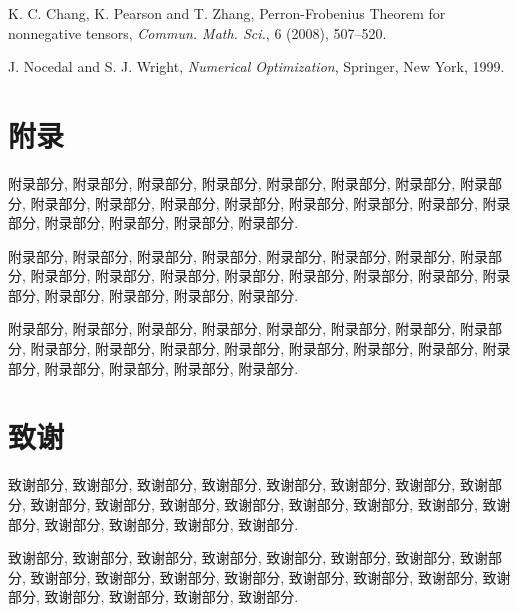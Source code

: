 \documentclass{ecnumaster}
\begin{document}
\backmatter
\linespread{1.1}\selectfont

\begin{thebibliography}{99}
\thispagestyle{plain}

\newblock K. C. Chang, K. Pearson and T. Zhang,
\newblock Perron-Frobenius Theorem for nonnegative tensors,
\newblock \emph{Commun. Math. Sci.}, 6 (2008), 507--520.

\newblock J. Nocedal and S. J. Wright,
\newblock \emph{Numerical Optimization},
\newblock Springer, New York, 1999.

\end{thebibliography}

\clearpage{\pagestyle{empty}\cleardoublepage}
\linespread{1.4}\selectfont
\chapter*{附录}

附录部分, 附录部分, 附录部分, 附录部分, 附录部分,
附录部分, 附录部分, 附录部分, 附录部分, 附录部分,
附录部分, 附录部分, 附录部分, 附录部分, 附录部分,
附录部分, 附录部分, 附录部分, 附录部分, 附录部分.

附录部分, 附录部分, 附录部分, 附录部分, 附录部分,
附录部分, 附录部分, 附录部分, 附录部分, 附录部分,
附录部分, 附录部分, 附录部分, 附录部分, 附录部分,
附录部分, 附录部分, 附录部分, 附录部分, 附录部分.

附录部分, 附录部分, 附录部分, 附录部分, 附录部分,
附录部分, 附录部分, 附录部分, 附录部分, 附录部分,
附录部分, 附录部分, 附录部分, 附录部分, 附录部分,
附录部分, 附录部分, 附录部分, 附录部分, 附录部分.


\clearpage{\pagestyle{empty}\cleardoublepage}
\chapter*{致谢}

致谢部分, 致谢部分, 致谢部分, 致谢部分, 致谢部分,
致谢部分, 致谢部分, 致谢部分, 致谢部分, 致谢部分,
致谢部分, 致谢部分, 致谢部分, 致谢部分, 致谢部分,
致谢部分, 致谢部分, 致谢部分, 致谢部分, 致谢部分.

致谢部分, 致谢部分, 致谢部分, 致谢部分, 致谢部分,
致谢部分, 致谢部分, 致谢部分, 致谢部分, 致谢部分,
致谢部分, 致谢部分, 致谢部分, 致谢部分, 致谢部分,
致谢部分, 致谢部分, 致谢部分, 致谢部分, 致谢部分.
\end{document}
